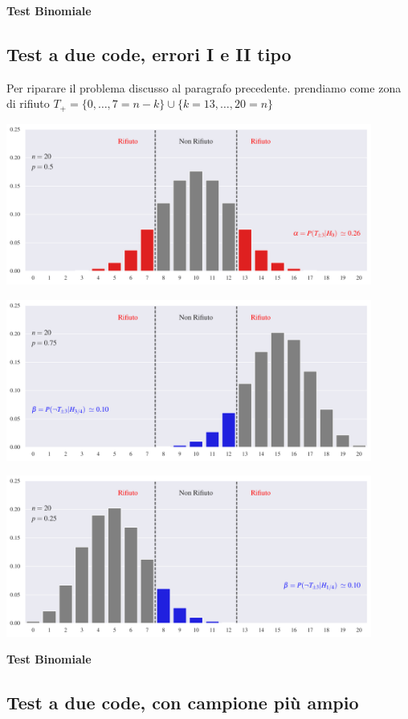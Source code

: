 \documentclass[11pt,openany]{book}
\begin{document}
\hfill{}\clearpage\hfill\textbf{Test Binomiale}\subsection{Test a due code, errori I e II tipo}

Per riparare il problema discusso al paragrafo precedente. prendiamo come zona di rifiuto $T_+=\{0,\dots,7=n-k\}\cup \{k=13,\dots,20=n\}$

\hfil\includegraphics[width=0.9\textwidth]{figure/B-test_04.pdf}

\hfil\includegraphics[width=0.9\textwidth]{figure/B-test_05.pdf}

\hfil\includegraphics[width=0.9\textwidth]{figure/B-test_06.pdf}




\hfill{}\clearpage\hfill\textbf{Test Binomiale}
\subsection{Test a due code, con campione più ampio}
\end{document}
